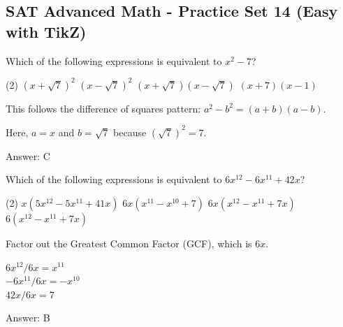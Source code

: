 \documentclass[11pt,paper=a4,answers]{exam}
\begin{document}
\begin{questions}
\pointsinrightmargin
\pointsdroppedatright
\marksnotpoints
{}
\pointformat{\boldmath\themarginpoints}
\bracketedpoints


\section*{SAT Advanced Math - Practice Set 14 (Easy with TikZ)}

\question
Which of the following expressions is equivalent to $x^2 - 7$?
\begin{tasks}(2)
    \task $(x + \sqrt{7})^2$
    \task $(x - \sqrt{7})^2$
    \task $(x + \sqrt{7})(x - \sqrt{7})$
    \task $(x + 7)(x - 1)$
\end{tasks}

\begin{solution}
This follows the difference of squares pattern: $a^2 - b^2 = (a+b)(a-b)$.
\vspace{5pt}
\begin{center}
Here, $a = x$ and $b = \sqrt{7}$ because $(\sqrt{7})^2 = 7$.
\end{center}
\vspace{5pt}
Answer: \colorbox{yellow!100}{C}
\end{solution}

\vspace{1cm}
\question
Which of the following expressions is equivalent to $6x^{12} - 6x^{11} + 42x$?
\begin{tasks}(2)
    \task $x(5x^{12} - 5x^{11} + 41x)$
    \task $6x(x^{11} - x^{10} + 7)$
    \task $6x(x^{12} - x^{11} + 7x)$
    \task $6(x^{12} - x^{11} + 7x)$
\end{tasks}

\begin{solution}
Factor out the Greatest Common Factor (GCF), which is $6x$.
\vspace{5pt}
\begin{center}
$6x^{12} / 6x = x^{11}$ \\
$-6x^{11} / 6x = -x^{10}$ \\
$42x / 6x = 7$
\end{center}
\vspace{5pt}
Answer: \colorbox{yellow!100}{B}
\end{solution}


\end{questions}
\end{document}

